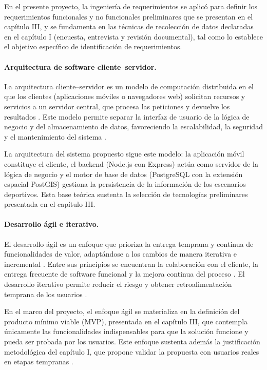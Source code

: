 En el presente proyecto, la ingenier\'ia de requerimientos se aplic\'o para
definir los requerimientos funcionales y no funcionales preliminares que se
presentan en el cap\'itulo III, y se fundamenta en las t\'ecnicas de
recolecci\'on de datos declaradas en el cap\'itulo I (encuesta, entrevista y
revisi\'on documental), tal como lo establece el objetivo espec\'ifico de
identificaci\'on de requerimientos.

\paragraph{Arquitectura de software cliente--servidor.} La arquitectura
cliente--servidor es un modelo de computaci\'on distribuida en el que los
clientes (aplicaciones m\'oviles o navegadores web) solicitan recursos y
servicios a un servidor central, que procesa las peticiones y devuelve los
resultados \citep{sommerville2011, kendall2011}. Este modelo permite separar
la interfaz de usuario de la l\'ogica de negocio y del almacenamiento de
datos, favoreciendo la escalabilidad, la seguridad y el mantenimiento del
sistema \citep{sommerville2011}.

La arquitectura del sistema propuesto sigue este modelo: la aplicaci\'on
m\'ovil constituye el cliente, el backend (Node.js con
Express) act\'ua como servidor de la l\'ogica de negocio y el motor de base de
datos (PostgreSQL con la extensi\'on espacial PostGIS) gestiona la
persistencia de la informaci\'on de los escenarios deportivos. Esta base
te\'orica sustenta la selecci\'on de tecnolog\'ias preliminares presentada en el
cap\'itulo III.

\paragraph{Desarrollo \'agil e iterativo.} El desarrollo \'agil es un enfoque
que prioriza la entrega temprana y continua de funcionalidades de valor,
adapt\'andose a los cambios de manera iterativa e incremental \citep{larman2004,
sommerville2011}. Entre sus principios se encuentran la colaboraci\'on con el
cliente, la entrega frecuente de software funcional y la mejora continua del
proceso \citep{sommerville2011}. El desarrollo iterativo permite reducir el
riesgo y obtener retroalimentaci\'on temprana de los usuarios \citep{larman2004}.

En el marco del proyecto, el enfoque \'agil se materializa en la definici\'on
del producto m\'inimo viable (MVP), presentada en el cap\'itulo III, que
contempla \'unicamente las funcionalidades indispensables para que la soluci\'on
funcione y pueda ser probada por los usuarios. Este enfoque sustenta adem\'as
la justificaci\'on metodol\'ogica del cap\'itulo I, que propone validar la
propuesta con usuarios reales en etapas tempranas \citep{larman2004}.

